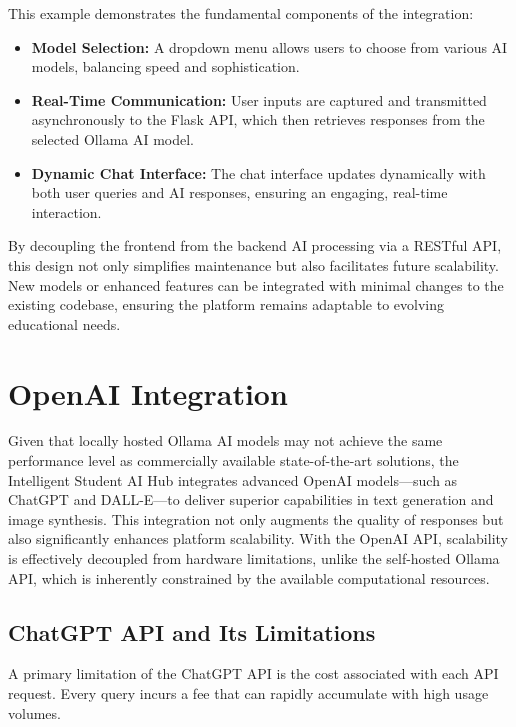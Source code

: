 This example demonstrates the fundamental components of the integration:
\begin{itemize}
  \item \textbf{Model Selection:} A dropdown menu allows users to choose from various AI models, balancing speed and sophistication.
  \item \textbf{Real-Time Communication:} User inputs are captured and transmitted asynchronously to the Flask API, which then retrieves responses from the selected Ollama AI model.
  \item \textbf{Dynamic Chat Interface:} The chat interface updates dynamically with both user queries and AI responses, ensuring an engaging, real-time interaction.
\end{itemize}

By decoupling the frontend from the backend AI processing via a RESTful API, this design not only simplifies maintenance but also facilitates future scalability. New models or enhanced features can be integrated with minimal changes to the existing codebase, ensuring the platform remains adaptable to evolving educational needs.


\section{OpenAI Integration}

Given that locally hosted Ollama AI models may not achieve the same performance level as commercially available state-of-the-art solutions, 
the Intelligent Student AI Hub integrates advanced OpenAI models—such as ChatGPT and DALL-E—to deliver superior capabilities in text generation and image synthesis. 
This integration not only augments the quality of responses but also significantly enhances platform scalability. With the OpenAI API, 
scalability is effectively decoupled from hardware limitations, unlike the self-hosted Ollama API, which is inherently constrained by the available computational 
resources.

\subsection{ChatGPT API and Its Limitations}

A primary limitation of the ChatGPT API is the cost associated with each API request. 
Every query incurs a fee that can rapidly accumulate with high usage volumes. 

